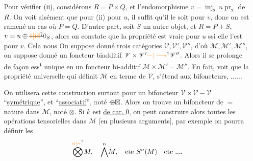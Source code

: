 Pour vérifier (ii),  considérons $R=P\times Q$, et l'endomorphisme  $v=\operatorname{inj}_2\,u\operatorname{pr}_2$ de $R$. On voit aisément que pour  (ii) pour $u$, il suffit  qu'il le soit pour $v$, donc on est ramené au cas où $P=Q$.
D'autre part, soit  $S$ un autre objet, et  $R=P+S$, $v=u\oplus\deleted{\unsure{1|\mathrm{id}}}0_S$, alors on constate que la propriété est vraie pour $u$ ssi elle l'est pour $v$. Cela nous
On suppose donné trois catégories  $\mathscr V,\mathscr V',\mathscr V''$, d'où $\mathcal M,\mathcal M',\mathcal M''$, on suppose donné un foncteur biadditif $\mathscr V\times\mathscr V'\unsure{\mathord{-}|\longrightarrow}\mathscr V''$. Alors il se prolonge de façon ess\textsuperscript{t} unique en un foncteur bi-additif $\mathcal M\times\mathcal M'-\mathcal M''$. En fait,  voit que la propriété universelle qui définit $\mathcal M$ en terme de $\mathscr V$, s'étend aux bifoncteurs, ......

On  utilisera cette construction surtout pour un bifoncteur $\mathscr V\times\mathscr V-\mathscr V$ ``\uline{symétrique}'', et ``\uline{associatif}'', noté $\deleted{\otimes}\boxtimes$. Alors on trouve un bifoncteur de $=$ nature dans $\mathcal M$, noté $\otimes$. Si $k$ est \uline{de car. $0$}, on peut construire alors toutes les opérations tensorielles dans $\mathcal M$ [en plusieurs arguments], par exemple on pourra définir les
\[
 \overset{\unsure{n|-}}{\bigotimes} M,\quad \overset{n}{\bigwedge}M,\quad\deleted{\text{etc}}\ S^n(M)\quad\text{etc ....}
\]
